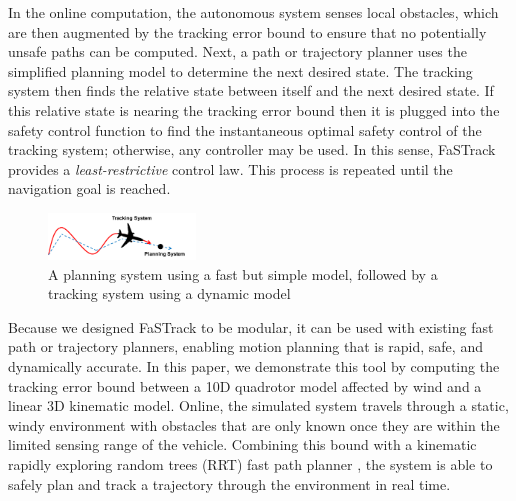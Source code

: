 In the online computation, the autonomous system senses local obstacles, which are then augmented by the tracking error bound to ensure that no potentially unsafe paths can be computed. Next, a path or trajectory planner uses the simplified planning model to determine the next desired state. The tracking system then finds the relative state between itself and the next desired state. If this relative state is nearing the tracking error bound then it is plugged into the safety control function to find the instantaneous optimal safety control of the tracking system; otherwise, any controller may be used. In this sense, FaSTrack provides a \emph{least-restrictive} control law. This process is repeated until the navigation goal is reached. 
  

\begin{figure}
	\centering
	\includegraphics[width=0.35\textwidth]{fig/chasing}
	\caption{A planning system using a fast but simple model, followed by a tracking system using a dynamic model}
	\label{fig:chasing}
	\vspace{-.23in}
\end{figure}
%
Because we designed FaSTrack to be modular, it can be used with existing fast path or trajectory planners, enabling motion planning that is rapid, safe, and dynamically accurate. In this paper, we demonstrate this tool by computing the tracking error bound between a 10D quadrotor model affected by wind and a linear 3D kinematic model. Online, the simulated system travels through a static, windy environment with obstacles that are only known once they are within the limited sensing range of the vehicle. Combining this bound with a kinematic rapidly exploring random trees (RRT) fast path planner \cite{Gavin2013}, the system is able to safely plan and track a trajectory through the environment in real time.